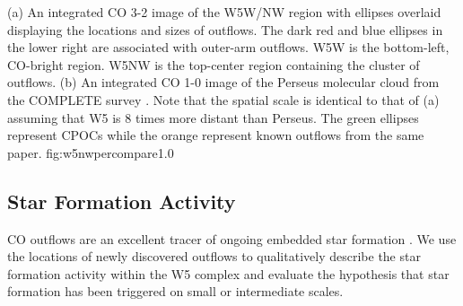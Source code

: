 {(a) An integrated CO 3-2 image of the W5W/NW region with ellipses overlaid
displaying the locations and sizes of outflows.  The dark red and blue ellipses
in the lower right are associated with outer-arm outflows.  W5W is the bottom-left,
CO-bright region.  W5NW is the top-center region containing the cluster of outflows.
(b) An integrated CO 1-0 image of the Perseus molecular cloud from the COMPLETE
survey \citep{arce2010}.  Note that the spatial scale is identical to that of
(a) assuming that W5 is 8 times more distant than Perseus.  The green ellipses
represent \citet{arce2010} CPOCs while the orange represent known outflows from
the same paper.}
{fig:w5nwpercompare}{1.0}



\subsection{Star Formation Activity}
\label{sec:sfactivity}

CO outflows are an excellent tracer of ongoing embedded star formation
\citep[e.g.][]{Shu1987}.  We use the locations of newly discovered outflows to
qualitatively describe the star formation activity within the W5 complex and
evaluate the hypothesis that star formation has been triggered on small or
intermediate scales.

